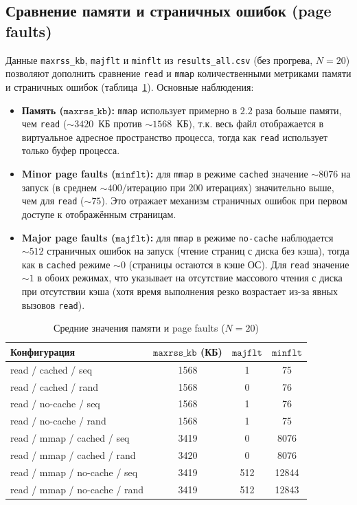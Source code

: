 \documentclass[12pt,a4paper]{article}
\begin{document}
\subsection{Сравнение памяти и страничных ошибок (page faults)}
Данные \texttt{maxrss\_kb}, \texttt{majflt} и \texttt{minflt} из \texttt{results\_all.csv} (без прогрева, $N=20$) позволяют дополнить сравнение \texttt{read} и \texttt{mmap} количественными метриками памяти и страничных ошибок (таблица~\ref{tab:mem}). Основные наблюдения:
\begin{itemize}
    \item \textbf{Память ($\texttt{maxrss\_kb}$):} \texttt{mmap} использует примерно в $2.2$ раза больше памяти, чем \texttt{read} ($\sim3420$~КБ против $\sim1568$~КБ), т.к. весь файл отображается в виртуальное адресное пространство процесса, тогда как \texttt{read} использует только буфер процесса.
    \item \textbf{Minor page faults ($\texttt{minflt}$):} для \texttt{mmap} в режиме \texttt{cached} значение $\sim8076$ на запуск (в среднем $\sim400$/итерацию при $200$ итерациях) значительно выше, чем для \texttt{read} ($\sim75$). Это отражает механизм страничных ошибок при первом доступе к отображённым страницам.
    \item \textbf{Major page faults ($\texttt{majflt}$):} для \texttt{mmap} в режиме \texttt{no-cache} наблюдается $\sim512$ страничных ошибок на запуск (чтение страниц с диска без кэша), тогда как в \texttt{cached} режиме $\sim0$ (страницы остаются в кэше ОС). Для \texttt{read} значение $\sim1$ в обоих режимах, что указывает на отсутствие массового чтения с диска при отсутствии кэша (хотя время выполнения резко возрастает из-за явных вызовов \texttt{read}).
\end{itemize}

\begin{table}[h]
\centering
\small
\caption{Средние значения памяти и page faults ($N=20$)}
\label{tab:mem}
\begin{tabular}{lccc}
\toprule
Конфигурация & $\texttt{maxrss\_kb}$ (КБ) & $\texttt{majflt}$ & $\texttt{minflt}$ \\
\midrule
read / cached / seq  & 1568 & 1 & 75 \\
read / cached / rand & 1568 & 0 & 76 \\
read / no-cache / seq & 1568 & 1 & 76 \\
read / no-cache / rand & 1568 & 1 & 75 \\
read / mmap / cached / seq  & 3419 & 0 & 8076 \\
read / mmap / cached / rand & 3420 & 0 & 8076 \\
read / mmap / no-cache / seq & 3419 & 512 & 12844 \\
read / mmap / no-cache / rand & 3419 & 512 & 12843 \\
\bottomrule
\end{tabular}
\end{table}
\end{document}
